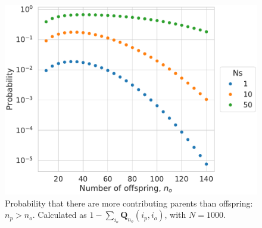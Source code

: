 \documentclass[review]{elsarticle}
\begin{document}
\begin{figure}[H]
  \centering
  \includegraphics[width=\textwidth]{fig/missing.pdf}
  \caption{Probability that there are more contributing parents than offspring: $n_p > n_o$.
    Calculated as $1-\sum_{i_o} \mathbf{Q}_{n_o}{(i_p, i_o)}$, with $N=1000$.}
  \label{fig_apx_missing}
\end{figure}


\end{document}
